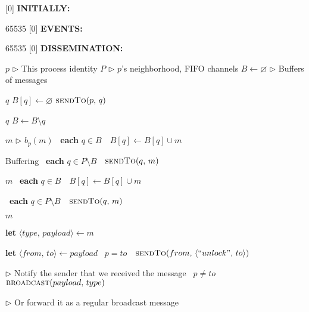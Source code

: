 
[0] {\textbf{INITIALLY:}}

{65535}{}
[0] {\textbf{EVENTS:}}

{65535}{}
[0] {\textbf{DISSEMINATION:}}


\newcommand{\comment}[1]{$\rhd$ #1}
\newcommand{\LINEIFTHEN}[2]{%
  \algorithmicif\ {#1}\ \algorithmicthen\ {#2} %
}
\newcommand{\LINEIFTHENELSE}[3]{%
  \algorithmicif\ {#1}\ \algorithmicthen\ {#2} \algorithmicelse\ {#3}%
}

\newcommand{\LINEFOR}[2]{%
  \algorithmicfor\ {#1}\ \algorithmicdo\ {#2} %
}

\begin{algorithmic}[1]

  \initially
  \State $p$ \hfill \comment{This process identity}
  \State $P$
  \hfill \comment{$p$'s neighborhood, FIFO channels}
  \State $B \leftarrow \varnothing$ 
  \hfill \comment{Buffers of messages}
  \endInitially
  
  \event
   {$q$}
  \State $B[q] \leftarrow \varnothing$
  \State $\textsc{sendTo}(p,\, q)$
  \EndIf
  \EndFunction
  
  \Statex

   {$q$}
  \State $B \leftarrow B \setminus q$
  \EndFunction

  \endEvent

  \dissemination

   {$m$}
  \hfill \comment{$b_p(m)$}
  \State \LINEFOR{\textbf{each} $q \in B$}
  {$B[q] \leftarrow B[q] \cup m$}
  \hfill{Buffering}%
  \State \LINEFOR{\textbf{each} $q \in P \setminus B$} 
  {$\textsc{sendTo}(q,\, m)$}
  \EndFunction

  \Statex
  
   {$m$}
  \State \LINEFOR{\textbf{each} $q \in B$}
  {$B[q] \leftarrow B[q] \cup m$}
  \State \LINEFOR{\textbf{each} $q \in P \setminus B$} 
  {$\textsc{sendTo}(q,\, m)$}
  \EndFunction

  \Statex

   {$m$}


  \State \textbf{let} $\langle type,\, payload \rangle \leftarrow m$
  
  \State \textbf{let} $\langle from,\, to \rangle \leftarrow payload$
  \State \LINEIFTHEN {$p = to$} 
  {$\textsc{sendTo}(from,\, \langle ``unlock",\, to \rangle)$}
  \hfill \comment{Notify the sender that we received the message}
  \State \LINEIFTHEN {$p \neq to$} {$\textsc{broadcast}(payload,\, type)$}
  \hfill \comment{Or forward it as a regular broadcast message}
  \EndIf
  

\end{algorithmic}
